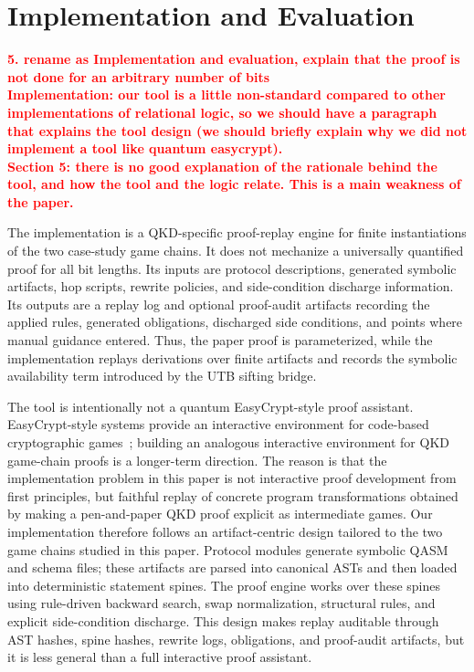 \documentclass[conference,compsoc]{IEEEtran}
\begin{document}
\endgroup

\smallskip
\section{Implementation and Evaluation}

\textbf{\textcolor{red}{5. rename as Implementation and evaluation, explain that the proof is not done for an arbitrary number of bits
\\
Implementation: our tool is a little non-standard compared to other implementations of relational logic, so we should have a paragraph that explains the tool design (we should briefly explain why we did not implement a tool like quantum easycrypt).
\\
Section 5: there is no good explanation of the rationale behind the tool, and how the tool and the logic relate. This is a main weakness of the paper.
}}

The implementation is a QKD-specific proof-replay engine for finite instantiations of the two case-study game chains. It does not mechanize a universally quantified proof for all bit lengths. Its inputs are protocol descriptions, generated symbolic artifacts, hop scripts, rewrite policies, and side-condition discharge information. Its outputs are a replay log and optional proof-audit artifacts recording the applied rules, generated obligations, discharged side conditions, and points where manual guidance entered. Thus, the paper proof is parameterized, while the implementation replays derivations over finite artifacts and records the symbolic availability term introduced by the \textsc{UTB} sifting bridge.

The tool is intentionally not a quantum EasyCrypt-style proof assistant. EasyCrypt-style systems provide an interactive environment for code-based cryptographic games~\cite{barthe2011computer,easycrypt}; building an analogous interactive environment for QKD game-chain proofs is a longer-term direction. The reason is that the implementation problem in this paper is not interactive proof development from first principles, but faithful replay of concrete program transformations obtained by making a pen-and-paper QKD proof explicit as intermediate games. Our implementation therefore follows an artifact-centric design tailored to the two game chains studied in this paper. Protocol modules generate symbolic QASM and schema files; these artifacts are parsed into canonical ASTs and then loaded into deterministic statement spines. The proof engine works over these spines using rule-driven backward search, swap normalization, structural rules, and explicit side-condition discharge. This design makes replay auditable through AST hashes, spine hashes, rewrite logs, obligations, and proof-audit artifacts, but it is less general than a full interactive proof assistant.
\end{document}
